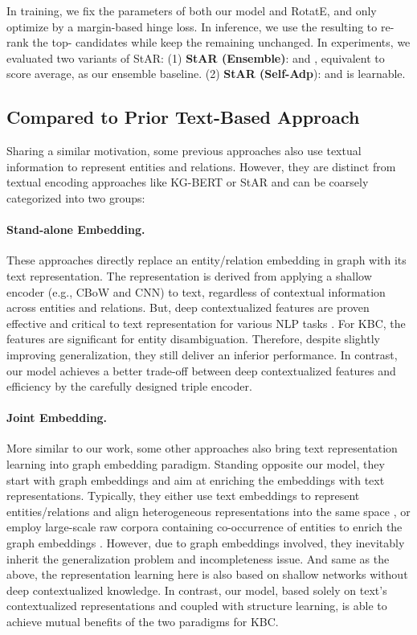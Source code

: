 \documentclass[sigconf]{acmart}
\begin{document}
In training, we fix the parameters of both our model and RotatE, and only optimize  by a margin-based hinge loss. 
In inference, we use the resulting  to re-rank the top- candidates while keep the remaining unchanged. 
In experiments, we evaluated two variants of StAR: 
(1) \textbf{StAR (Ensemble)}:  and , equivalent to score average, as our ensemble baseline. 
(2) \textbf{StAR (Self-Adp}):  and  is learnable. 


\subsection{Compared to Prior Text-Based Approach } \label{subsec:compared_text-based}
Sharing a similar motivation, some previous approaches also use textual information to represent entities and relations. 
However, they are distinct from textual encoding approaches like KG-BERT or StAR and can be coarsely categorized into two groups:

\paragraph{Stand-alone Embedding.}
These approaches \cite{socher2013kgc,McIlraith2018open} directly replace an entity/relation embedding in graph with its text representation. The representation is derived from applying a shallow encoder (e.g., CBoW and CNN) to text, regardless of contextual information across entities and relations. 
But, deep contextualized features are proven effective and critical to text representation for various NLP tasks \cite{ELMo,BERT}. For KBC, the features are significant for entity disambiguation. 
Therefore, despite slightly improving generalization, they still deliver an inferior performance. 
In contrast, our model achieves a better trade-off between deep contextualized features and efficiency by the carefully designed triple encoder. 

\paragraph{Joint Embedding.} 
More similar to our work, some other approaches \cite{xiao2017ssp,wang2014knowledge,xie2016representation,dieudonat2020exploring,xu2017TEKE,yamada2016joint,FB15k-237} also bring text representation learning into graph embedding paradigm. Standing opposite our model, they start with graph embeddings and aim at enriching the embeddings with text representations. 
Typically, they either use text embeddings to represent entities/relations and align heterogeneous representations into the same space \cite{wang2014knowledge,yamada2016joint,xie2016representation}, or employ large-scale raw corpora containing co-occurrence of entities to enrich the graph embeddings \cite{xu2017TEKE}. 
However, due to graph embeddings involved, they inevitably inherit the generalization problem and incompleteness issue. And same as the above, the representation learning here is also based on shallow networks without deep contextualized knowledge. 
In contrast, our model, based solely on text's contextualized representations and coupled with structure learning, is able to achieve mutual benefits of the two paradigms for KBC. 
\end{document}
